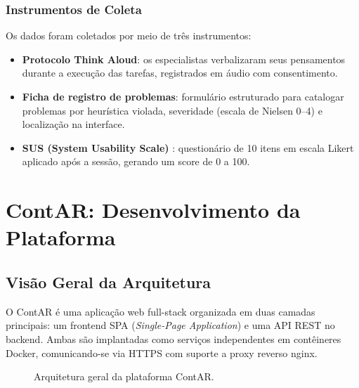 \documentclass[
  12pt,
  openright,
  twoside,
  a4paper,
  english,
  brazil
]{abntex2}
\begin{document}
\subsection{Instrumentos de Coleta}
\label{subsec:instrumentos}

Os dados foram coletados por meio de três instrumentos:

\begin{itemize}
  \item \textbf{Protocolo Think Aloud}: os especialistas verbalizaram
        seus pensamentos durante a execução das tarefas, registrados
        em áudio com consentimento.
  \item \textbf{Ficha de registro de problemas}: formulário estruturado
        para catalogar problemas por heurística violada, severidade
        (escala de Nielsen 0--4) e localização na interface.
  \item \textbf{SUS (System Usability Scale)} \cite{brooke1996sus}:
        questionário de 10 itens em escala Likert aplicado após a
        sessão, gerando um score de 0 a 100.
\end{itemize}


\chapter{ContAR: Desenvolvimento da Plataforma}
\label{cap:desenvolvimento}

\section{Visão Geral da Arquitetura}
\label{sec:arquitetura}

O ContAR é uma aplicação web full-stack organizada em duas camadas
principais: um frontend SPA (\textit{Single-Page Application}) e uma
API REST no backend. Ambas são implantadas como serviços independentes
em contêineres Docker, comunicando-se via HTTPS com suporte a proxy
reverso nginx.

\begin{figure}[ht]
  \centering
  \caption{Arquitetura geral da plataforma ContAR.}
  \label{fig:arquitetura}
\end{figure}
\end{document}
